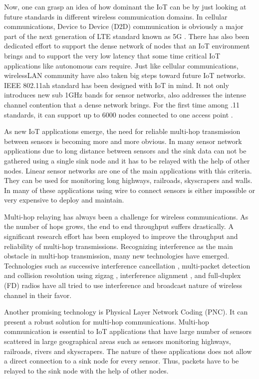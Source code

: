 Now, one can grasp an idea of how dominant the IoT can be by just looking at future standards in different wireless communication domains. In cellular communications, Device to Device (D2D) communication is obviously a major part of the next generation of LTE standard known as 5G \cite{doppler2009device}. There has also been dedicated effort to support the dense network of nodes that an IoT environment brings and to support the very low latency that some time critical IoT applications like autonomous cars require. Just like cellular communications, wirelessLAN community have also taken big steps toward future IoT networks. IEEE 802.11ah standard has been designed with IoT in mind. It not only introduces new sub 1GHz bands for sensor networks, also addresses the intense channel contention that a dense network brings. For the first time among .11 standards, it can support up to 6000 nodes connected to one access point \cite{khorov2015survey}. 


As new IoT applications emerge, the need for reliable multi-hop transmission between sensors is becoming more and more obvious. In many sensor network applications due to long distance between sensors and the sink data can not be gathered using a single sink node and it has to be relayed with the help of other nodes. Linear sensor networks are one of the main applications with this criteria. They can be used for monitoring long highways, railroads, skyscrapers and walls. In many of these applications using wire to connect sensors is either impossible or very expensive to deploy and maintain.

Multi-hop relaying has always been a challenge for wireless communications. As the number of hops grows, the end to end throughput suffers drastically. A significant research effort has been employed to improve the throughput and reliability of multi-hop transmissions. Recognizing interference as the main obstacle in multi-hop transmission, many new technologies have emerged. Technologies such as successive interference cancellation \cite{alvandi2015delay}, multi-packet detection and collision resolution using zigzag \cite{mzig}, interference alignment \cite{4567443, 7218598}, and full-duplex (FD) radios \cite{fullduplex} have all tried to use interference and broadcast nature of wireless channel in their favor.


Another promising technology is Physical Layer Network Coding (PNC). It can present a robust solution for multi-hop communications. Multi-hop communication is essential to IoT applications that have large number of sensors scattered in large geographical areas such as sensors monitoring highways, railroads, rivers and skyscrapers. The nature of these applications does not allow a direct connection to a sink node for every sensor. Thus, packets have to be relayed to the sink node with the help of other nodes. 



